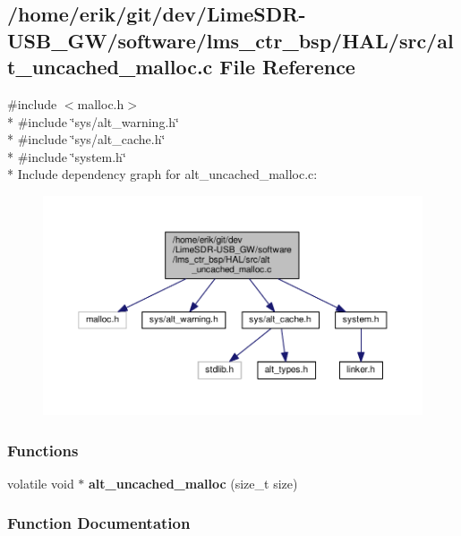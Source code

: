 \subsection{/home/erik/git/dev/\+Lime\+S\+D\+R-\/\+U\+S\+B\+\_\+\+G\+W/software/lms\+\_\+ctr\+\_\+bsp/\+H\+A\+L/src/alt\+\_\+uncached\+\_\+malloc.c File Reference}
\label{alt__uncached__malloc_8c}
{\ttfamily \#include $<$malloc.\+h$>$}\\*
{\ttfamily \#include \char`\"{}sys/alt\+\_\+warning.\+h\char`\"{}}\\*
{\ttfamily \#include \char`\"{}sys/alt\+\_\+cache.\+h\char`\"{}}\\*
{\ttfamily \#include \char`\"{}system.\+h\char`\"{}}\\*
Include dependency graph for alt\+\_\+uncached\+\_\+malloc.\+c\+:
\nopagebreak
\begin{figure}[H]
\begin{center}
\leavevmode
\includegraphics[width=350pt]{dc/d16/alt__uncached__malloc_8c__incl}
\end{center}
\end{figure}
\subsubsection*{Functions}
\begin{DoxyCompactItemize}
\item 
volatile void $\ast$ {\bf alt\+\_\+uncached\+\_\+malloc} (size\+\_\+t size)
\end{DoxyCompactItemize}


\subsubsection{Function Documentation}
